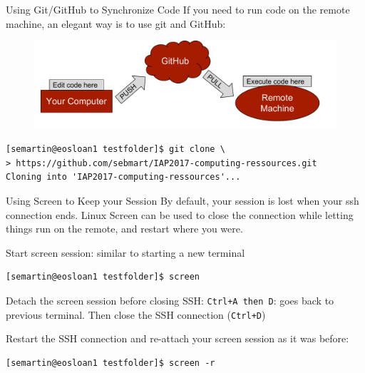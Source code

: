 \documentclass{beamer}
\begin{document}
\begin{frame}[fragile]{Using Git/GitHub to Synchronize Code}
    If you need to run code on the remote machine, an elegant way is to use git and GitHub:
    \begin{figure}
      \includegraphics[width=\linewidth]{figures/iap2017-diagram4}
    \end{figure}
    \pause
    \begin{verbatim}
[semartin@eosloan1 testfolder]$ git clone \
> https://github.com/sebmart/IAP2017-computing-ressources.git
Cloning into 'IAP2017-computing-ressources'...
    \end{verbatim}
\end{frame}

\begin{frame}[fragile]{Using Screen to Keep your Session}
  By default, your session is lost when your ssh connection ends. \alert{Linux Screen} can be used to close the connection while letting things run on the remote, and restart where you were.

  \pause

  \vspace{0.5cm}

  \alert{Start screen session}: similar to starting a new terminal

  \begin{verbatim}
[semartin@eosloan1 testfolder]$ screen
  \end{verbatim}

  \alert{Detach the screen session} before closing SSH: \texttt{Ctrl+A then D}: goes back to previous terminal. Then close the SSH connection (\texttt{Ctrl+D})

  \vspace{0.3cm}

  Restart the SSH connection and \alert{re-attach your screen session} as it was before:
  \begin{verbatim}
[semartin@eosloan1 testfolder]$ screen -r
  \end{verbatim}
\end{frame}
\end{document}
